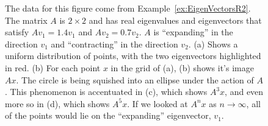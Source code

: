 \begin{figure}[h]%
\centering
{}%
\hspace{5pt}%
%
\hspace{5pt}%
\hspace{5pt}%
%
    \caption[]{The data for this figure come from Example~\ref{ex:EigenVectorsR2}. The matrix $A$ is  $2 \times 2$ and has real eigenvalues and eigenvectors that satisfy $Av_1 = 1.4 v_1$ and $A v_2 = 0.7 v_2$. $A$ is ``expanding'' in the direction $v_1$ and ``contracting'' in the direction $v_2$. (a) Shows a uniform distribution of points, with the two eigenvectors highlighted in red. (b) For each point $x$ in the grid of (a), (b) shows it's image $Ax$. The circle is being squished into an ellipse under the action of $A$. This phenomenon is accentuated in (c), which shows $A^3 x$, and even more so in (d), which shows $A^5 x$. If we looked at $A^n x$ as $n \to \infty$, all of the points would lie on the ``expanding'' eigenvector, $v_1$.
    }
    \label{fig:SquishingSpace}
\end{figure}

